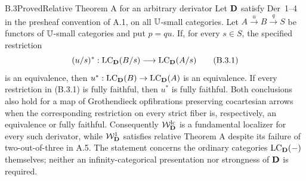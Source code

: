 \begin{claim}{B.3}{Proved}{Relative Theorem A for an arbitrary derivator}
Let $\mathbf D$ satisfy Der~1--4 in the presheaf convention of A.1, on all
$\mathbb U$-small categories. Let $A\xrightarrow{u}B\xrightarrow{q}S$ be
functors of $\mathbb U$-small categories and put $p=qu$. If, for every
$s\in S$, the specified restriction
\[
 (u/s)^*:\operatorname{LC}_\mathbf D(B/s)\longrightarrow\operatorname{LC}_\mathbf D(A/s)
 \tag{B.3.1}
\]
is an equivalence, then $u^*:\operatorname{LC}_\mathbf D(B)\to\operatorname{LC}_\mathbf D(A)$ is an
equivalence. If every restriction in (B.3.1) is fully faithful,
then $u^*$ is fully faithful. Both conclusions also hold for a map
of Grothendieck opfibrations preserving cocartesian arrows when the
corresponding restriction on every strict fiber is, respectively,
an equivalence or fully faithful. Consequently $\mathcal W_{\mathbf D}^{\mathrm{lc}}$ is a
fundamental localizer for every such derivator, while $\mathcal W_{\mathbf D}^{1}$
satisfies relative Theorem A despite its failure of
two-out-of-three in A.5. The statement concerns the ordinary categories
$\operatorname{LC}_\mathbf D(-)$ themselves; neither an infinity-categorical presentation
nor strongness of $\mathbf D$ is required.
\end{claim}
